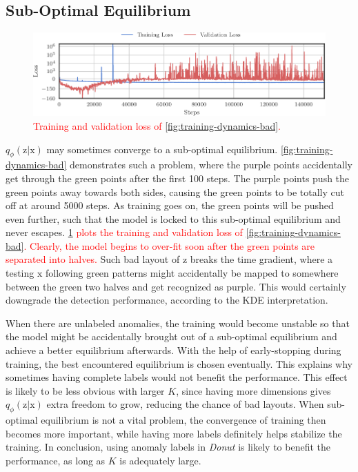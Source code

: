 \documentclass[sigconf]{acmart}
\newcommand\compactdel[1]{{\textcolor{red}{#1}}}
\newcommand\compactdel[1]{}
\newcommand\compactdel[1]{#1}
\newcommand{\DONUT}{\textit{Donut}}
\newcommand{\vv}[1]{\bm{\mathrm{{#1}}}}
\begin{document}
\subsection{Sub-Optimal Equilibrium}
\label{sec:sub-optimal-equilibrium}

\compactdel{
\begin{figure}
	\centering
	\includegraphics[width=\columnwidth]{loss_distribution_failed_trainer}
	\caption{\compactdel{
		Training and validation loss of \cref{fig:training-dynamics-bad}.
}}
	\label{fig:training-dynamics-bad-loss}
\end{figure}
}

$q_{\phi}(\vv{z}|\vv{x})$ may sometimes converge to a sub-optimal equilibrium.
\cref{fig:training-dynamics-bad} demonstrates such a problem, where the purple points accidentally get through the green points after the first 100 steps.
The purple points push the green points away towards both sides, causing the green points to be totally cut off at around 5000 steps.
As training goes on, the green points will be pushed even further, such that the model is locked to this sub-optimal equilibrium and never escapes.
\compactdel{
\cref{fig:training-dynamics-bad-loss} plots the training and validation loss of \cref{fig:training-dynamics-bad}.
Clearly, the model begins to over-fit soon after the green points are separated into halves.
}
Such bad layout of $\vv{z}$ breaks the time gradient, where a testing $\vv{x}$ following green patterns might accidentally be mapped to somewhere between the green two halves and get recognized as purple.
This would certainly downgrade the detection performance, according to the KDE interpretation.

When there are unlabeled anomalies, the training would become unstable so that the model might be accidentally brought out of a sub-optimal equilibrium and achieve a better equilibrium afterwards.
With the help of early-stopping during training, the best encountered equilibrium is chosen eventually.
This explains why sometimes having complete labels would not benefit the performance.
This effect is likely to be less obvious with larger $K$, since having more dimensions gives $q_{\phi}(\vv{z}|\vv{x})$ extra freedom to grow, reducing the chance of  bad layouts.
When sub-optimal equilibrium is not a vital problem, the convergence of training then becomes more important, while having more labels definitely helps stabilize the training.
In conclusion, using anomaly labels in \DONUT{} is likely to benefit the performance, as long as $K$ is adequately large.
\end{document}
